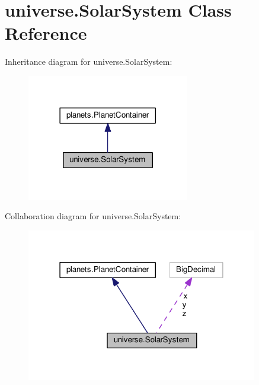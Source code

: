 \hypertarget{classuniverse_1_1_solar_system}{}\section{universe.\+Solar\+System Class Reference}
\label{classuniverse_1_1_solar_system}


Inheritance diagram for universe.\+Solar\+System\+:\nopagebreak
\begin{figure}[H]
\begin{center}
\leavevmode
\includegraphics[width=201pt]{classuniverse_1_1_solar_system__inherit__graph}
\end{center}
\end{figure}


Collaboration diagram for universe.\+Solar\+System\+:\nopagebreak
\begin{figure}[H]
\begin{center}
\leavevmode
\includegraphics[width=286pt]{classuniverse_1_1_solar_system__coll__graph}
\end{center}
\end{figure}

